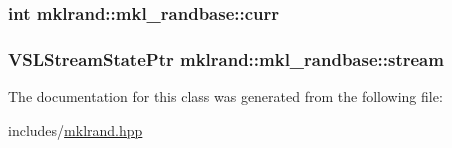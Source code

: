 \subsubsection[{\texorpdfstring{curr}{curr}}]{\setlength{\rightskip}{0pt plus 5cm}int mklrand\+::mkl\+\_\+randbase\+::curr\hspace{0.3cm}{\ttfamily [protected]}}\hypertarget{classmklrand_1_1mkl__randbase_aeb5c3f18b6d46a6ee53cfeb2a1d95388}{}\label{classmklrand_1_1mkl__randbase_aeb5c3f18b6d46a6ee53cfeb2a1d95388}
\subsubsection[{\texorpdfstring{stream}{stream}}]{\setlength{\rightskip}{0pt plus 5cm}V\+S\+L\+Stream\+State\+Ptr mklrand\+::mkl\+\_\+randbase\+::stream\hspace{0.3cm}{\ttfamily [protected]}}\hypertarget{classmklrand_1_1mkl__randbase_a1668b51838583d64b176e159b16bfa7a}{}\label{classmklrand_1_1mkl__randbase_a1668b51838583d64b176e159b16bfa7a}


The documentation for this class was generated from the following file\+:\begin{DoxyCompactItemize}
\item 
includes/\hyperlink{mklrand_8hpp}{mklrand.\+hpp}\end{DoxyCompactItemize}
